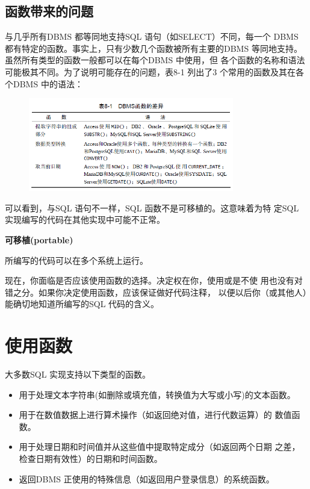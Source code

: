 \documentclass[11pt,a4paper,oneside]{book}
\begin{document}
\subsection{函数带来的问题}
与几乎所有DBMS 都等同地支持SQL 语句（如SELECT）不同，每一个
DBMS 都有特定的函数。事实上，只有少数几个函数被所有主要的DBMS
等同地支持。虽然所有类型的函数一般都可以在每个DBMS 中使用，但
各个函数的名称和语法可能极其不同。为了说明可能存在的问题，表8-1
列出了3 个常用的函数及其在各个DBMS 中的语法：
\begin{figure}[H]
	\centering
	\includegraphics[width=0.8\textwidth]{4.png}
\end{figure}
可以看到，与SQL 语句不一样，SQL 函数不是可移植的。这意味着为特
定SQL 实现编写的代码在其他实现中可能不正常。
\begin{tcolorbox}[colback=blue!7!white,colframe=blue!40]
	\textbf{可移植(portable)}	
	
	所编写的代码可以在多个系统上运行。
\end{tcolorbox}

现在，你面临是否应该使用函数的选择。决定权在你，使用或是不使
用也没有对错之分。如果你决定使用函数，应该保证做好代码注释，
以便以后你（或其他人）能确切地知道所编写的SQL 代码的含义。

\section{使用函数}
大多数SQL 实现支持以下类型的函数。
\begin{itemize}
	\item 用于处理文本字符串(如删除或填充值，转换值为大写或小写)的文本函数。
	\item 用于在数值数据上进行算术操作（如返回绝对值，进行代数运算）的
	数值函数。
	\item 用于处理日期和时间值并从这些值中提取特定成分（如返回两个日期
	之差，检查日期有效性）的日期和时间函数。
	\item 返回DBMS 正使用的特殊信息（如返回用户登录信息）的系统函数。
\end{itemize}
\end{document}
